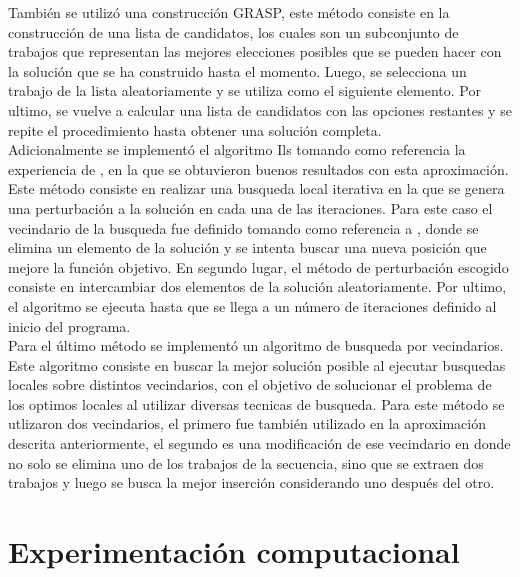 \documentclass[10pt, twoside]{article}
\begin{document}
También se utilizó una construcción GRASP, este método consiste en la
construcción de una lista de candidatos, los cuales son un subconjunto
de trabajos que representan las mejores elecciones posibles que se pueden hacer
con la solución que se ha construido hasta el momento. Luego, se selecciona un
trabajo de la lista aleatoriamente y se utiliza como el siguiente elemento. Por
ultimo, se vuelve a calcular una lista de candidatos con las opciones restantes
y se repite el procedimiento hasta obtener una solución completa.\\

Adicionalmente se implementó el algoritmo Ils tomando como referencia la
experiencia de \cite{ils}, en la que se obtuvieron buenos resultados con esta
aproximación. Este método consiste en realizar una busqueda local iterativa en
la que se genera una perturbación a la solución en cada una de las iteraciones.
Para este caso el vecindario de la busqueda fue definido tomando como referencia
a \cite{localsearch}, donde se elimina un elemento de la solución y se intenta
buscar una nueva posición que mejore la función objetivo. En segundo lugar, el
método de perturbación escogido consiste en intercambiar dos elementos de la solución
aleatoriamente. Por ultimo, el algoritmo se ejecuta hasta que se llega a un
número de iteraciones definido al inicio del programa.\\

Para el último método se implementó un algoritmo de busqueda por vecindarios. Este
algoritmo consiste en buscar la mejor solución posible al ejecutar busquedas
locales sobre distintos vecindarios, con el objetivo de solucionar el problema
de los optimos locales al utilizar diversas tecnicas de busqueda. Para este método
se utlizaron dos vecindarios, el primero fue también utilizado en la aproximación
descrita anteriormente, el segundo es una modificación de ese vecindario en donde
no solo se elimina uno de los trabajos de la secuencia, sino que se extraen dos
trabajos y luego se busca la mejor inserción considerando uno después del otro.

\cite{genetic1}
\cite{genetic2}
\cite{genetic3}

\section{Experimentación computacional}
\end{document}
